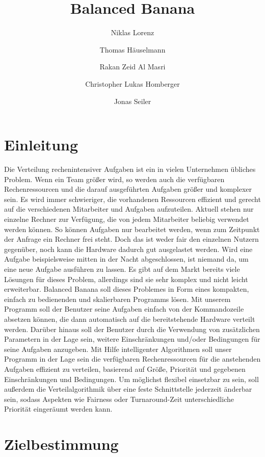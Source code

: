 \documentclass[a4paper,12pt]{article}
\title{Balanced Banana}
\author{Niklas Lorenz \and Thomas Häuselmann \and Rakan Zeid Al Masri \and Christopher Lukas Homberger \and Jonas Seiler}
\begin{document}
\setcounter{page}{2}
\tableofcontents          %
\clearpage
{}

\section{Einleitung}
\vspace*{1cm}

Die Verteilung rechenintensiver Aufgaben ist ein in vielen Unternehmen übliches Problem. Wenn ein Team größer wird, 
so werden auch die verfügbaren Rechenressourcen und die darauf ausgeführten Aufgaben größer und komplexer sein.
Es wird immer schwieriger, die vorhandenen Ressourcen effizient und gerecht auf die verschiedenen Mitarbeiter und Aufgaben aufzuteilen.
Aktuell stehen nur einzelne Rechner zur Verfügung, die von jedem Mitarbeiter beliebig verwendet werden können. So können Aufgaben nur bearbeitet werden,
wenn zum Zeitpunkt der Anfrage ein Rechner frei steht. Doch das ist weder fair den einzelnen Nutzern gegenüber, noch kann die Hardware dadurch gut ausgelastet werden.
Wird eine Aufgabe beispielsweise mitten in der Nacht abgeschlossen, ist niemand da, um eine neue Aufgabe ausführen zu lassen.
Es gibt auf dem Markt bereits viele Lösungen für dieses Problem, allerdings sind sie sehr komplex und nicht leicht erweiterbar.
Balanced Banana soll dieses Problemes in Form eines kompakten, einfach zu bedienenden und skalierbaren Programms lösen.
Mit unserem Programm soll der Benutzer seine Aufgaben einfach von der Kommandozeile absetzen können, die dann automatisch auf die bereitstehende Hardware verteilt werden.
Darüber hinaus soll der Benutzer durch die Verwendung von zusätzlichen Parametern in der Lage sein, weitere Einschränkungen und/oder Bedingungen für seine Aufgaben anzugeben.
Mit Hilfe intelligenter Algorithmen soll unser Programm in der Lage sein die verfügbaren Rechenressourcen für die anstehenden Aufgaben effizient zu verteilen,
basierend auf Größe, Priorität und gegebenen Einschränkungen und Bedingungen. Um möglichst flexibel einsetzbar zu sein, soll außerdem die Verteilalgorithmik
über eine feste Schnittstelle jederzeit änderbar sein, sodass Aspekten wie Fairness oder Turnaround-Zeit unterschiedliche Priorität eingeräumt werden kann.

\section{Zielbestimmung}
\end{document}
